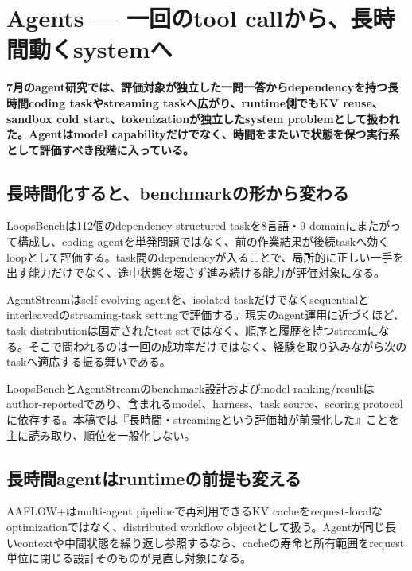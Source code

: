 \section{Agents — 一回のtool callから、長時間動くsystemへ}
\label{pkg:agents-july}
\noindent\textbf{7月のagent研究では、評価対象が独立した一問一答からdependencyを持つ長時間coding taskやstreaming taskへ広がり、runtime側でもKV reuse、sandbox cold start、tokenizationが独立したsystem problemとして扱われた。Agentはmodel capabilityだけでなく、時間をまたいで状態を保つ実行系として評価すべき段階に入っている。}\autocite{src-30d9d574d4a1,src-4051106eaef3,src-4141dfcd9b12}

\subsection{長時間化すると、benchmarkの形から変わる}

LoopsBenchは112個のdependency-structured taskを8言語・9 domainにまたがって構成し、coding agentを単発問題ではなく、前の作業結果が後続taskへ効くloopとして評価する。task間のdependencyが入ることで、局所的に正しい一手を出す能力だけでなく、途中状態を壊さず進み続ける能力が評価対象になる。\autocite{src-4141dfcd9b12}


AgentStreamはself-evolving agentを、isolated taskだけでなくsequentialとinterleavedのstreaming-task settingで評価する。現実のagent運用に近づくほど、task distributionは固定されたtest setではなく、順序と履歴を持つstreamになる。そこで問われるのは一回の成功率だけではなく、経験を取り込みながら次のtaskへ適応する振る舞いである。\autocite{src-30d9d574d4a1}


\begin{claimboundary}
LoopsBenchとAgentStreamのbenchmark設計およびmodel ranking/resultはauthor-reportedであり、含まれるmodel、harness、task source、scoring protocolに依存する。本稿では『長時間・streamingという評価軸が前景化した』ことを主に読み取り、順位を一般化しない。\autocite{src-30d9d574d4a1,src-4141dfcd9b12}
\end{claimboundary}

\subsection{長時間agentはruntimeの前提も変える}

AAFLOW+はmulti-agent pipelineで再利用できるKV cacheをrequest-localなoptimizationではなく、distributed workflow objectとして扱う。Agentが同じ長いcontextや中間状態を繰り返し参照するなら、cacheの寿命と所有範囲をrequest単位に閉じる設計そのものが見直し対象になる。\autocite{src-4051106eaef3}


